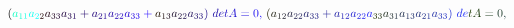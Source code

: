 \documentclass[12pt]{article}
\begin{document}
\begin{displaymath}
{(} \mathcolor[RGB]{15,255,195}{a} _ { \mathcolor[RGB]{15,255,210}{1} \mathcolor[RGB]{15,255,225}{1} } \mathcolor[RGB]{15,255,240}{a} _ { \mathcolor[RGB]{15,255,255}{2} \mathcolor[RGB]{30,0,0}{2} } \mathcolor[RGB]{30,0,15}{a} _ { \mathcolor[RGB]{30,0,30}{3} \mathcolor[RGB]{30,0,45}{3} } \mathcolor[RGB]{30,0,60}{a} _ { \mathcolor[RGB]{30,0,75}{3} \mathcolor[RGB]{30,0,90}{1} } \mathcolor[RGB]{30,0,105}{+} \mathcolor[RGB]{30,0,120}{a} _ { \mathcolor[RGB]{30,0,135}{2} \mathcolor[RGB]{30,0,150}{1} } \mathcolor[RGB]{30,0,165}{a} _ { \mathcolor[RGB]{30,0,180}{2} \mathcolor[RGB]{30,0,195}{2} } \mathcolor[RGB]{30,0,210}{a} _ { \mathcolor[RGB]{30,0,225}{3} \mathcolor[RGB]{30,0,240}{3} } \mathcolor[RGB]{30,0,255}{+} \mathcolor[RGB]{30,15,0}{a} _ { \mathcolor[RGB]{30,15,15}{1} \mathcolor[RGB]{30,15,30}{3} } \mathcolor[RGB]{30,15,45}{a} _ { \mathcolor[RGB]{30,15,60}{2} \mathcolor[RGB]{30,15,75}{2} } \mathcolor[RGB]{30,15,90}{a} _ { \mathcolor[RGB]{30,15,105}{3} \mathcolor[RGB]{30,15,120}{3} } \mathcolor[RGB]{30,15,135}{)} \mathcolor[RGB]{30,15,150}{\operatorname*} { \mathcolor[RGB]{30,15,165}{d} \mathcolor[RGB]{30,15,180}{e} \mathcolor[RGB]{30,15,195}{t} } \mathcolor[RGB]{30,15,210}{A} \mathcolor[RGB]{30,15,225}{=} \mathcolor[RGB]{30,15,240}{0} \mathcolor[RGB]{30,15,255}{,} \mathcolor[RGB]{30,30,0}{\,
(} \mathcolor[RGB]{30,30,15}{a} _ { \mathcolor[RGB]{30,30,30}{1} \mathcolor[RGB]{30,30,45}{2} } \mathcolor[RGB]{30,30,60}{a} _ { \mathcolor[RGB]{30,30,75}{2} \mathcolor[RGB]{30,30,90}{2} } \mathcolor[RGB]{30,30,105}{a} _ { \mathcolor[RGB]{30,30,120}{3} \mathcolor[RGB]{30,30,135}{3} } \mathcolor[RGB]{30,30,150}{+} \mathcolor[RGB]{30,30,165}{a} _ { \mathcolor[RGB]{30,30,180}{1} \mathcolor[RGB]{30,30,195}{2} } \mathcolor[RGB]{30,30,210}{a} _ { \mathcolor[RGB]{30,30,225}{2} \mathcolor[RGB]{30,30,240}{2} } \mathcolor[RGB]{30,30,255}{a} _ { \mathcolor[RGB]{30,45,0}{3} \mathcolor[RGB]{30,45,15}{3} } \mathcolor[RGB]{30,45,30}{a} _ { \mathcolor[RGB]{30,45,45}{3} \mathcolor[RGB]{30,45,60}{1} } \mathcolor[RGB]{30,45,75}{a} _ { \mathcolor[RGB]{30,45,90}{1} \mathcolor[RGB]{30,45,105}{3} } \mathcolor[RGB]{30,45,120}{a} _ { \mathcolor[RGB]{30,45,135}{2} \mathcolor[RGB]{30,45,150}{1} } \mathcolor[RGB]{30,45,165}{a} _ { \mathcolor[RGB]{30,45,180}{3} \mathcolor[RGB]{30,45,195}{3} } \mathcolor[RGB]{30,45,210}{)} \mathcolor[RGB]{30,45,225}{\operatorname*} { \mathcolor[RGB]{30,45,240}{d} \mathcolor[RGB]{30,45,255}{e} \mathcolor[RGB]{30,60,0}{t} } \mathcolor[RGB]{30,60,15}{A} \mathcolor[RGB]{30,60,30}{=} \mathcolor[RGB]{30,60,45}{0} \mathcolor[RGB]{30,60,60}{,} \mathcolor[RGB]{30,60,75}{\,
}
\end{displaymath}
\end{document}
